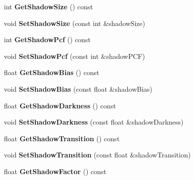 \begin{DoxyCompactItemize}
int {\bfseries Get\+Shadow\+Size} () const
\item 
\mbox{\label{class_flounder_1_1_shadows_a939d7791ce095a260da29321e8fa42f9}} 
void {\bfseries Set\+Shadow\+Size} (const int \&shadow\+Size)
\item 
\mbox{\label{class_flounder_1_1_shadows_a9f4275c924c1053f0b0836041896a83a}} 
int {\bfseries Get\+Shadow\+Pcf} () const
\item 
\mbox{\label{class_flounder_1_1_shadows_aa0086b1f3a5418e168b254b10b05349a}} 
void {\bfseries Set\+Shadow\+Pcf} (const int \&shadow\+P\+CF)
\item 
\mbox{\label{class_flounder_1_1_shadows_a70901f22da2483515f5b7611014a089c}} 
float {\bfseries Get\+Shadow\+Bias} () const
\item 
\mbox{\label{class_flounder_1_1_shadows_aa9a1d7c4eb91ebc906321ea3e385a9e4}} 
void {\bfseries Set\+Shadow\+Bias} (const float \&shadow\+Bias)
\item 
\mbox{\label{class_flounder_1_1_shadows_ae8c1f4aea149c4459035ae497e7889f1}} 
float {\bfseries Get\+Shadow\+Darkness} () const
\item 
\mbox{\label{class_flounder_1_1_shadows_a93834af1a4c390b8dca7b877f1fccfdd}} 
void {\bfseries Set\+Shadow\+Darkness} (const float \&shadow\+Darkness)
\item 
\mbox{\label{class_flounder_1_1_shadows_a2b5bf29a37858ff1094d62f863d3eb0e}} 
float {\bfseries Get\+Shadow\+Transition} () const
\item 
\mbox{\label{class_flounder_1_1_shadows_a7a7ab7a80b1625f503202c46b4b8bde4}} 
void {\bfseries Set\+Shadow\+Transition} (const float \&shadow\+Transition)
\item 
\mbox{\label{class_flounder_1_1_shadows_abbfd8aa3ee245512a1601c7519ea2fbd}} 
float {\bfseries Get\+Shadow\+Factor} () const
\item 

\end{DoxyCompactItemize}
